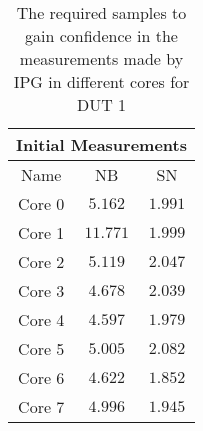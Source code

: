 \begin{table}[H]
    \centering
    \begin{tabular}{|| c | c | c ||}
    \hline
    \multicolumn{3}{||c||}{Initial Measurements} \\ [0.5ex] \hline\hline
    Name & NB & SN \\\hline
    Core 0 & $5.162$ & $1.991$ \\
    Core 1 & $11.771$ & $1.999$ \\
    Core 2 & $5.119$ & $2.047$ \\
    Core 3 & $4.678$ & $2.039$ \\
    Core 4 & $4.597$ & $1.979$ \\
    Core 5 & $5.005$ & $2.082$ \\
    Core 6 & $4.622$ & $1.852$ \\
    Core 7 & $4.996$ & $1.945$ \\\hline
    \end{tabular}
    \caption{The required samples to gain confidence in the measurements made by IPG in different cores for DUT 1}
    \label{tab:initial-measurements-exp-3-dut-1}
\end{table}